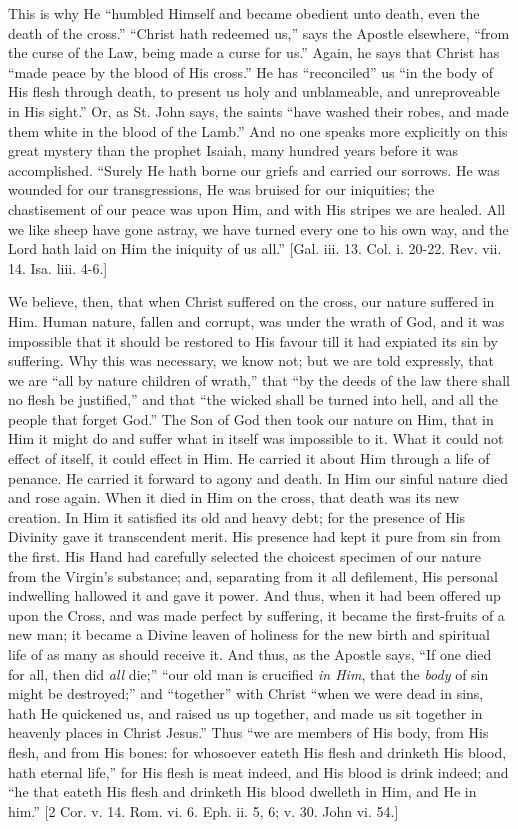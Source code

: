 This is why He ``humbled Himself and became obedient unto death,
even the death of the cross.'' ``Christ hath redeemed us,''
says the Apostle elsewhere, ``from the curse of the Law, being made
a curse for us.'' Again, he says that Christ has ``made peace by
the blood of His cross.'' He has ``reconciled'' us ``in
the body of His flesh through death, to present us holy and unblameable,
and unreproveable in His sight.'' Or, as St. John says, the saints
``have washed their robes, and made them white in the blood of the
Lamb.'' And no one speaks more explicitly on this great mystery than
the prophet Isaiah, many hundred years before it was accomplished.
``Surely He hath borne our griefs and carried our sorrows. He was
wounded for our transgressions, He was bruised for our iniquities; the
chastisement of our peace was upon Him, and with His stripes we are
healed. All we like sheep have gone astray, we have turned every one to
his own way, and the Lord hath laid on Him the iniquity of us all.''
[Gal. iii. 13. Col. i. 20-22. Rev. vii. 14. Isa. liii. 4-6.]

We believe, then, that when Christ suffered on the cross, our nature
suffered in Him. Human nature, fallen and corrupt, was under the wrath
of God, and it was impossible that it should be restored to His favour
till it had expiated its sin by suffering. Why this was necessary, we
know not; but we are told expressly, that we are ``all by nature
children of wrath,'' that ``by the deeds of the law there shall
no flesh be justified,'' and that ``the wicked shall be turned
into hell, and all the people that forget God.'' The Son of God then
took our nature on Him, that in Him it might do and suffer what in
itself was impossible to it. What it could not effect of itself, it
could effect in Him. He carried it about Him through a life of penance.
He carried it forward to agony and death. In Him our sinful nature died
and rose again. When it died in Him on the cross, that death was its new
creation. In Him it satisfied its old and heavy debt; for the presence
of His Divinity gave it transcendent merit. His presence had kept it
pure from sin from the first. His Hand had carefully selected the
choicest specimen of our nature from the Virgin's substance; and,
separating from it all defilement, His personal indwelling hallowed it
and gave it power. And thus, when it had been offered up upon the Cross,
and was made perfect by suffering, it became the first-fruits of a new
man; it became a Divine leaven of holiness for the new birth and
spiritual life of as many as should receive it. And thus, as the Apostle
says, ``If one died for all, then did \emph{all} die;''
``our old man is crucified \emph{in Him}, that the \emph{body} of
sin might be destroyed;'' and ``together'' with Christ
``when we were dead in sins, hath He quickened us, and raised us up
together, and made us sit together in heavenly places in Christ
Jesus.'' Thus ``we are members of His body, from His flesh, and
from His bones: for whosoever eateth His flesh and drinketh His blood,
hath eternal life,'' for His flesh is meat indeed, and His blood is
drink indeed; and ``he that eateth His flesh and drinketh His blood
dwelleth in Him, and He in him.'' [2 Cor. v. 14. Rom. vi. 6. Eph.
ii. 5, 6; v. 30. John vi. 54.]

